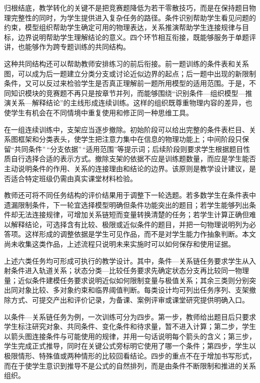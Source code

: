\documentclass[
  12pt,
  a4paper]{ctexbook}
\begin{document}
归根结底，教学转化的关键不是把竞赛题降低为若干零散技巧，而是在保持题目物理完整性的同时，为学生提供进入复杂任务的路径。条件识别帮助学生看见问题的约束，模型组织帮助学生确定可用的物理表达，关系推演帮助学生连接规律与目标，边界说明帮助学生理解结论的意义。四个环节相互衔接，既能够服务于单题评讲，也能够作为跨专题训练的共同结构。

这种共同结构还可以帮助教师安排练习的前后衔接。前一题训练的条件表和关系图，可以成为后一题建立分类分支或讨论近似边界的起点；后一题中出现的新限制条件，又可以反过来检验学生是否真正理解前一题所用模型的适用范围。于是，不同知识模块的竞赛题不再只是按章节并列，而能够围绕``识别条件---组织模型---推演关系---解释结论''的主线形成连续训练。这样的组织既尊重物理内容的差异，也使学生有机会在不同情境中重复使用和修正同一种思维工具。

在一组连续训练中，支架应当逐步撤除。初始阶段可以给出完整的条件表栏目、关系图框架和分类表头，使学生把注意力集中在信息的物理功能上；中间阶段只保留``共同条件''\,``分支依据''\,``适用范围''等提示词；后续阶段则要求学生根据题目性质自行选择合适的表示方式。撤除支架的依据不应是训练题数量，而应是学生能否主动说明条件的作用、关系的连接理由和结论的边界。该原则是教学设计建议，是否适合特定班级仍需由真实课堂材料检验。

教师还可将不同任务结构的评价结果用于调整下一轮选题。若多数学生在条件表中遗漏限制条件，下一轮宜选择模型明确但条件功能突出的题目；若学生能够列出条件却无法连接规律，可增加关系链短而变量转换清楚的任务；若学生计算正确但难以解释结论，可选择含有比较、极限或近似条件的题目，并把一句物理说明列为必答项。这样形成的调整依据是学生可见作品，而不是对学生能力作抽象判断。本文尚未收集这类作品，上述流程只说明未来实施时可以如何保存和使用证据。

上述六类任务均可形成可执行的教学设计。其中，条件---关系链任务要求学生从入射条件进入轨道关系；状态分类---比较任务要求先确定状态分支再比较同一物理量；近似条件建模任务要求说明近似如何限制变量与极值关系；其余三类则分别突出同对象比较、多对象约束和临界阈值判断。每类设计均可列出任务序列、支架撤除方式、可提交产出和评价记录，为备课、案例评审或课堂研究提供明确入口。

以条件---关系链任务为例，一次训练可分为四步。第一步，教师给出题目后只要求学生标注研究对象、共同条件、变化条件和待求量，暂不进入计算；第二步，学生以箭头图连接条件与可能使用的规律，并用一句话说明每个箭头的含义；第三步，学生完成正式推导，同时在关键公式旁标明它使用了哪一个条件；第四步，学生以极限情形、特殊值或两种情形的比较回看结论。四步的重点不在于增加书写形式，而在于使学生意识到推导不是公式的自然排列，而是由条件不断限制和推进的关系组织。
\end{document}

